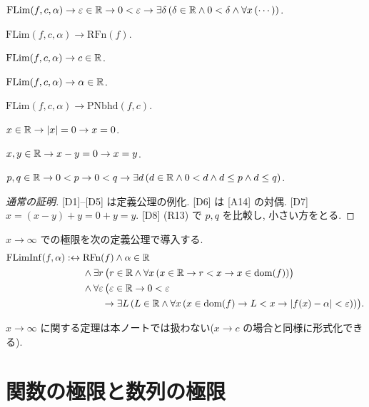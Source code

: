 \begin{lem}\label{lem:flim-unfold}
  \begin{enumerate}[label={[D\arabic*]}]
    \item $\mathrm{FLim}(f, c, \alpha) \to \varepsilon \in \mathbb{R} \to 0 < \varepsilon \to \exists \delta\,(\delta \in \mathbb{R} \land 0 < \delta \land \forall x\,(\cdots))$.
    \item $\mathrm{FLim}(f, c, \alpha) \to \mathrm{RFn}(f)$.
    \item $\mathrm{FLim}(f, c, \alpha) \to c \in \mathbb{R}$.
    \item $\mathrm{FLim}(f, c, \alpha) \to \alpha \in \mathbb{R}$.
    \item $\mathrm{FLim}(f, c, \alpha) \to \mathrm{PNbhd}(f, c)$.
    \item $x \in \mathbb{R} \to \lvert x\rvert = 0 \to x = 0$.
    \item $x, y \in \mathbb{R} \to x - y = 0 \to x = y$.
    \item $p, q \in \mathbb{R} \to 0 < p \to 0 < q \to \exists d\,(d \in \mathbb{R} \land 0 < d \land d \leq p \land d \leq q)$.
  \end{enumerate}
\end{lem}
\begin{proof}[通常の証明]
  [D1]--[D5] は定義公理の例化. [D6] は [A14] の対偶. [D7] $x = (x - y) + y = 0 + y = y$. [D8] (R13) で $p, q$ を比較し, 小さい方をとる.
\end{proof}


\begin{dfn}[テキスト定義1.3]\label{dfn:flim-inf}
  $x \to \infty$ での極限を次の定義公理で導入する.
  \begin{align*}
    \mathrm{FLimInf}(f, \alpha) :\leftrightarrow{}& \mathrm{RFn}(f) \land \alpha \in \mathbb{R} \\
    & \land \exists r\,\bigl(r \in \mathbb{R} \land \forall x\,(x \in \mathbb{R} \to r < x \to x \in \mathrm{dom}(f))\bigr) \\
    & \land \forall\varepsilon\,\bigl(\varepsilon \in \mathbb{R} \to 0 < \varepsilon \\
    & \qquad \to \exists L\,(L \in \mathbb{R} \land \forall x\,(x \in \mathrm{dom}(f) \to L < x \to \lvert f(x) - \alpha\rvert < \varepsilon))\bigr).
  \end{align*}
\end{dfn}
$x \to \infty$ に関する定理は本ノートでは扱わない($x \to c$ の場合と同様に形式化できる).

\section{関数の極限と数列の極限}

